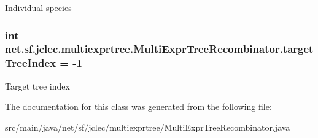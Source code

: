 Individual species \hypertarget{classnet_1_1sf_1_1jclec_1_1multiexprtree_1_1_multi_expr_tree_recombinator_ae23a11a63ed3649deef2a3c6272f0474}{
\subsubsection[{target\-Tree\-Index}]{\setlength{\rightskip}{0pt plus 5cm}int net.\-sf.\-jclec.\-multiexprtree.\-Multi\-Expr\-Tree\-Recombinator.\-target\-Tree\-Index = -\/1\hspace{0.3cm}{\ttfamily [protected]}}}\label{classnet_1_1sf_1_1jclec_1_1multiexprtree_1_1_multi_expr_tree_recombinator_ae23a11a63ed3649deef2a3c6272f0474}
Target tree index 

The documentation for this class was generated from the following file\-:\begin{DoxyCompactItemize}
\item 
src/main/java/net/sf/jclec/multiexprtree/Multi\-Expr\-Tree\-Recombinator.\-java\end{DoxyCompactItemize}
